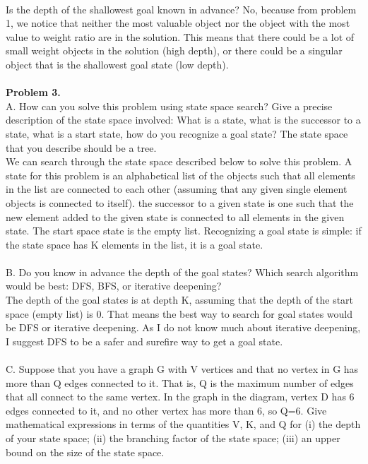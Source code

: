 \documentclass{article}
\begin{document}
\\
Is the depth of the shallowest goal known in advance? No, because from problem 1, we notice that neither the most valuable object nor the object with the most value to weight ratio are in the solution. This means that there could be a lot of small weight objects in the solution (high depth), or there could be a singular object that is the shallowest goal state (low depth).\\
\\
\textbf{Problem 3.}\\
A. How can you solve this problem using state space search? Give a precise description of the state space involved: What is a state, what is the successor to a state, what is a start state, how do you recognize a goal state? The state space that you describe should be a tree.\\
We can search through the state space described below to solve this problem. A state for this problem is an alphabetical list of the objects such that all elements in the list are connected to each other (assuming that any given single element objects is connected to itself). the successor to a given state is one such that the new element added to the given state is connected to all elements in the given state. The start space state is the empty list. Recognizing a goal state is simple: if the state space has K elements in the list, it is a goal state.\\
\\
B. Do you know in advance the depth of the goal states? Which search algorithm would be best: DFS, BFS, or iterative deepening?\\
The depth of the goal states is at depth K, assuming that the depth of the start space (empty list) is 0. That means the best way to search for goal states would be DFS or iterative deepening. As I do not know much about iterative deepening, I suggest DFS to be a safer and surefire way to get a goal state.\\
\\
C. Suppose that you have a graph G with V vertices and that no vertex in G has more than Q edges connected to it. That is, Q is the maximum number of edges that all connect to the same vertex. In the graph in the diagram, vertex D has 6 edges connected to it, and no other vertex has more than 6, so Q=6. Give mathematical expressions in terms of the quantities V, K, and Q for (i) the depth of your state space; (ii) the branching factor of the state space; (iii) an upper bound on the size of the state space.\\
\end{document}
